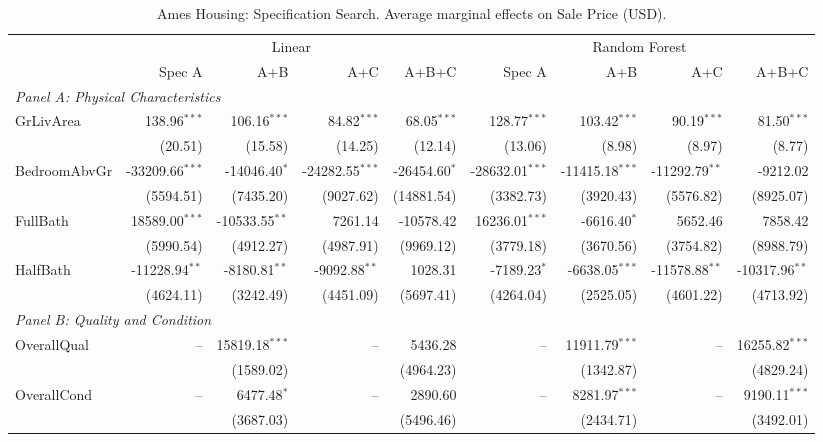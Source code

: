 \begin{table}[htbp]
\centering
\small
\begin{threeparttable}
\caption{Ames Housing: Specification Search. Average marginal effects on Sale Price (USD).}
\label{tab:ames_housing_spec_search}
\begin{tabular}{lrrrrrrrr}
\toprule
 & \multicolumn{4}{c}{Linear} & \multicolumn{4}{c}{Random Forest} \\
\cmidrule(lr){2-5} \cmidrule(lr){6-9} 
 & Spec A & A+B & A+C & A+B+C & Spec A & A+B & A+C & A+B+C \\
\midrule
\multicolumn{9}{l}{\textit{Panel A: Physical Characteristics}} \\
\quad GrLivArea & 138.96$^{***}$ & 106.16$^{***}$ & 84.82$^{***}$ & 68.05$^{***}$ & 128.77$^{***}$ & 103.42$^{***}$ & 90.19$^{***}$ & 81.50$^{***}$ \\
 & (20.51) & (15.58) & (14.25) & (12.14) & (13.06) & (8.98) & (8.97) & (8.77) \\
\quad BedroomAbvGr & -33209.66$^{***}$ & -14046.40$^{*}$ & -24282.55$^{***}$ & -26454.60$^{*}$ & -28632.01$^{***}$ & -11415.18$^{***}$ & -11292.79$^{**}$ & -9212.02 \\
 & (5594.51) & (7435.20) & (9027.62) & (14881.54) & (3382.73) & (3920.43) & (5576.82) & (8925.07) \\
\quad FullBath & 18589.00$^{***}$ & -10533.55$^{**}$ & 7261.14 & -10578.42 & 16236.01$^{***}$ & -6616.40$^{*}$ & 5652.46 & 7858.42 \\
 & (5990.54) & (4912.27) & (4987.91) & (9969.12) & (3779.18) & (3670.56) & (3754.82) & (8988.79) \\
\quad HalfBath & -11228.94$^{**}$ & -8180.81$^{**}$ & -9092.88$^{**}$ & 1028.31 & -7189.23$^{*}$ & -6638.05$^{***}$ & -11578.88$^{**}$ & -10317.96$^{**}$ \\
 & (4624.11) & (3242.49) & (4451.09) & (5697.41) & (4264.04) & (2525.05) & (4601.22) & (4713.92) \\
\midrule
\multicolumn{9}{l}{\textit{Panel B: Quality and Condition}} \\
\quad OverallQual & -- & 15819.18$^{***}$ & -- & 5436.28 & -- & 11911.79$^{***}$ & -- & 16255.82$^{***}$ \\
 &  & (1589.02) &  & (4964.23) &  & (1342.87) &  & (4829.24) \\
\quad OverallCond & -- & 6477.48$^{*}$ & -- & 2890.60 & -- & 8281.97$^{***}$ & -- & 9190.11$^{***}$ \\
 &  & (3687.03) &  & (5496.46) &  & (2434.71) &  & (3492.01) \\

\end{tabular}
\end{threeparttable}
\end{table}
